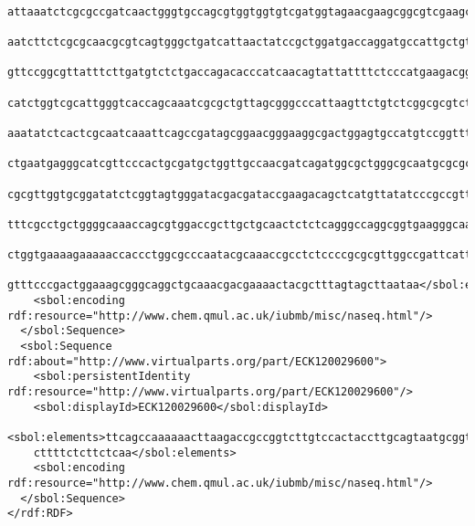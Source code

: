 \begin{lstlisting}
    attaaatctcgcgccgatcaactgggtgccagcgtggtggtgtcgatggtagaacgaagcggcgtcgaagcctgtaaagcggcggtgcac
    aatcttctcgcgcaacgcgtcagtgggctgatcattaactatccgctggatgaccaggatgccattgctgtggaagctgcctgcactaat
    gttccggcgttatttcttgatgtctctgaccagacacccatcaacagtattattttctcccatgaagacggtacgcgactgggcgtggag
    catctggtcgcattgggtcaccagcaaatcgcgctgttagcgggcccattaagttctgtctcggcgcgtctgcgtctggctggctggcat
    aaatatctcactcgcaatcaaattcagccgatagcggaacgggaaggcgactggagtgccatgtccggttttcaacaaaccatgcaaatg
    ctgaatgagggcatcgttcccactgcgatgctggttgccaacgatcagatggcgctgggcgcaatgcgcgccattaccgagtccgggctg
    cgcgttggtgcggatatctcggtagtgggatacgacgataccgaagacagctcatgttatatcccgccgttaaccaccatcaaacaggat
    tttcgcctgctggggcaaaccagcgtggaccgcttgctgcaactctctcagggccaggcggtgaagggcaatcagctgttgcccgtctca
    ctggtgaaaagaaaaaccaccctggcgcccaatacgcaaaccgcctctccccgcgcgttggccgattcattaatgcagctggcacgacag
    gtttcccgactggaaagcgggcaggctgcaaacgacgaaaactacgctttagtagcttaataa</sbol:elements>
    <sbol:encoding rdf:resource="http://www.chem.qmul.ac.uk/iubmb/misc/naseq.html"/>
  </sbol:Sequence>
  <sbol:Sequence rdf:about="http://www.virtualparts.org/part/ECK120029600">
    <sbol:persistentIdentity rdf:resource="http://www.virtualparts.org/part/ECK120029600"/>
    <sbol:displayId>ECK120029600</sbol:displayId>
    <sbol:elements>ttcagccaaaaaacttaagaccgccggtcttgtccactaccttgcagtaatgcggtggacaggatcggcggtttt
    cttttctcttctcaa</sbol:elements>
    <sbol:encoding rdf:resource="http://www.chem.qmul.ac.uk/iubmb/misc/naseq.html"/>
  </sbol:Sequence>
</rdf:RDF>

\end{lstlisting}
